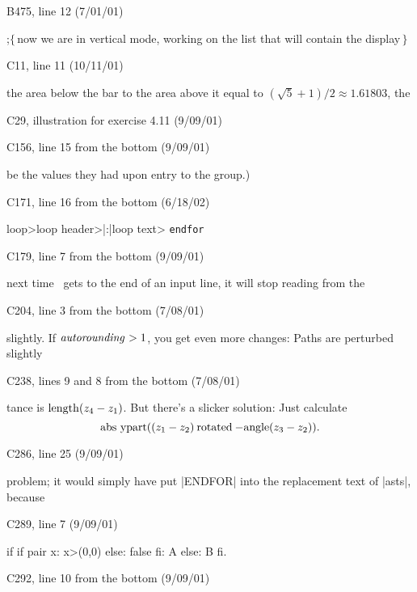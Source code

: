 {\bugonpage B475, line 12 (7/01/01)

\ninepoint\noindent
{};\quad$\{\,$now we are in vertical mode,
 working on the list that will contain the display$\,\}$

\hsize=29pc
\def\\#1{\hbox{\it#1\/\kern.05em}} %

\bugonpage C11, line 11 (10/11/01)

\noindent
the area below the bar to the area above it equal to
$(\sqrt5+1)/2\approx1.61803$, the\cutpar

\bugonpage C29, illustration for exercise 4.11 (9/09/01)


\bugonpage C156, line 15 from the bottom (9/09/01)

\ninepoint\noindent
be the values they had upon entry to the group.)

\bugonpage C171, line 16 from the bottom (6/18/02)

\tenpoint
\<loop>\is\<loop header>|:|\<loop text> {\tt endfor}

\bugonpage C179, line 7 from the bottom (9/09/01)

\ninepoint\noindent
next time \MF\ gets to the end of an input line, it will stop reading
from the\cutpar

\bugonpage C204, line 3 from the bottom (7/08/01)

\ninepoint\noindent
slightly. If $\\{autorounding}>1$,
you get even more changes: Paths are perturbed slightly\cutpar

\bugonpage C238, lines 9 and 8 from the bottom (7/08/01)

\ninepoint\noindent
tance is ${\rm length}(z_4-z_1)$. But there's a slicker solution:
Just calculate
$$\hbox{abs ypart$((z_1-z_2)\mathbin{\rm rotated}-{\rm angle}(z_3-z_2))$.}$$

\bugonpage C286, line 25 (9/09/01)

\ninepoint\noindent
problem; it would simply have put |ENDFOR| into the
replacement text of |asts|, because\cutpar

\bugonpage C289, line 7 (9/09/01)

\vskip-6pt\ninepoint\begintt
if if pair x: x>(0,0) else: false fi: A else: B fi.
\endtt

\bugonpage C292, line 10 from the bottom (9/09/01)

}
